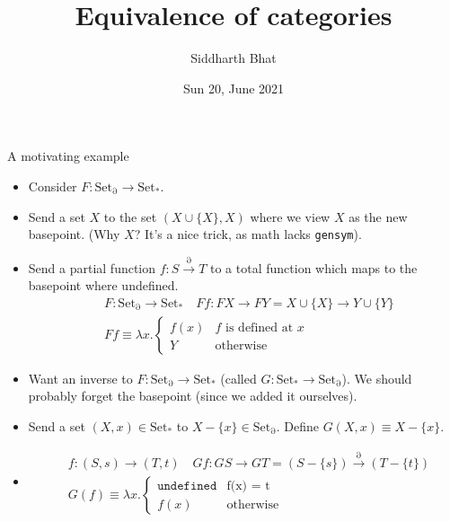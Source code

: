 \documentclass[8pt]{beamer}
\author{Siddharth Bhat}
\date{Sun 20, June 2021}
\institute{\texttt{\#\#harmless} Category Theory in Context}
\title{Equivalence of categories}
\newcommand{\partialset}{\ensuremath{\operatorname{Set_\partial}}}
\newcommand{\pointedset}{\ensuremath{\operatorname{Set_*}}}
\begin{document}
\maketitle


\begin{frame}{A motivating example}
    \begin{itemize}
            \item Consider $F: \partialset \rightarrow \pointedset$. \pause 
            \item Send a set $X$ to the set $(X \cup \{ X \}, X )$ where we view $X$ as the new basepoint. \pause
                (Why $X$? It's a nice trick, as math lacks \texttt{gensym}). \pause
            \item Send a partial function $f: S \xrightarrow{\partial} T$ to a total function which maps to the basepoint where undefined. \pause
                \begin{align*}
                    &
                    F: \partialset \rightarrow \pointedset \quad 
                    Ff : FX \rightarrow FY =  X \cup \{ X \} \rightarrow Y \cup \{ Y \} \\
                    &Ff \equiv \lambda x.
                    \begin{cases}
                        f(x) & \text{$f$ is defined at $x$} \\
                        Y & \text{otherwise} 
                    \end{cases}
                \end{align*} 
            \item Want an inverse to $F: \partialset \rightarrow \pointedset$ (called $G: \pointedset \rightarrow \partialset$). \pause We should probably forget the basepoint (since we added it ourselves). \pause
            \item Send a set $(X, x) \in \pointedset$ to $X - \{ x \} \in \partialset$. \pause Define $ G(X, x) \equiv X - \{ x \}$. \pause
            \item 
                \begin{align*}
                    &f: (S, s) \rightarrow (T, t) \quad Gf: GS \rightarrow GT = (S -\{s\}) \xrightarrow{\partial} (T - \{ t \}) \\
                &G(f) \equiv \lambda x.
                \begin{cases}
                    \texttt{undefined} & \text{f(x) = t} \\
                    f(x) & \text{otherwise}
                \end{cases}
                \end{align*}
        \end{itemize}
\end{frame}
\end{document}
